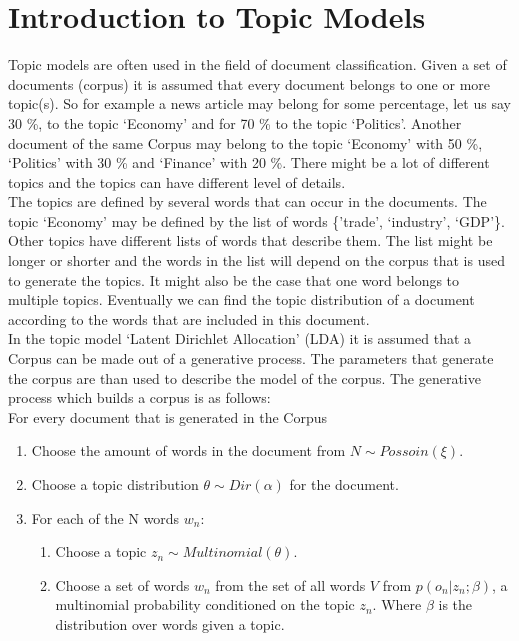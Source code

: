 \section{Introduction to Topic Models}
Topic models are often used in the field of document classification. Given a set of documents (corpus) it is assumed that every document belongs to one or more topic(s). So for example a news article may belong for some percentage, let us say 30 \%,  to the topic `Economy' and for 70 \%  to the topic `Politics'. Another document of the same Corpus may belong to the topic `Economy' with 50 \%, `Politics' with 30 \% and `Finance' with 20 \%. There might be a lot of different topics and the topics can have different level of details. \\
The topics are defined by several words that can occur in the documents. The topic `Economy' may be defined by the list of words \{'trade', `industry', `GDP'\}. Other topics have different lists of words that describe them. The list might be longer or shorter and the words in the list will depend on the corpus that is used to generate the topics. It might also be the case that one word belongs to multiple topics. Eventually we can find the topic distribution of a document according to the words that are included in this document.\\
In the topic model `Latent Dirichlet Allocation' (LDA) it is assumed that a Corpus can be made out of a generative process. The parameters that generate the corpus are than used to describe the model of the corpus. The generative process which builds a corpus is as follows:\\
For every document that is generated in the Corpus
\begin{enumerate}
 \item Choose the amount of words in the document from $N \sim Possoin(\xi)$.
 \item Choose a topic distribution $\theta \sim Dir(\alpha)$ for the document.
 \item For each of the N words $w_n$:
 
 \begin{enumerate}
  \item Choose a topic $z_n \sim Multinomial(\theta)$.
  \item Choose a set of words $w_n$ from the set of all words $V$ from $p(o_n |z_n;\beta)$, a multinomial probability conditioned on the topic $z_n$. Where $\beta$ is the distribution over words given a topic.
 \end{enumerate}

\end{enumerate}

